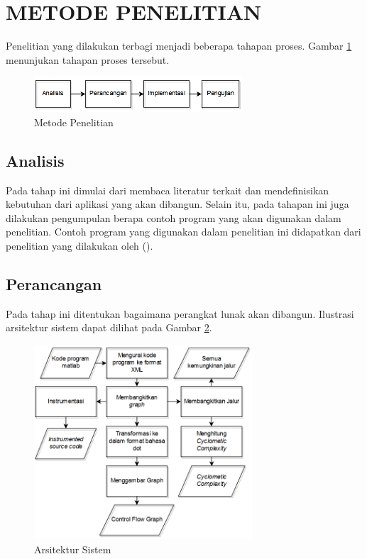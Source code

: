\section*{METODE PENELITIAN}

Penelitian yang dilakukan terbagi menjadi beberapa tahapan proses. Gambar \ref{fig:metodepenelitian} menunjukan tahapan proses tersebut.

\begin{figure}[h!]
	\centering
	\includegraphics[width=220pt]{gambar/metode_penelitian}
	\caption{Metode Penelitian}
	\label{fig:metodepenelitian}
\end{figure}

\subsection*{Analisis}

Pada tahap ini dimulai dari membaca literatur terkait dan mendefinisikan kebutuhan dari aplikasi yang akan dibangun. Selain itu, pada tahapan ini juga dilakukan pengumpulan berapa contoh program yang akan digunakan dalam penelitian. Contoh program yang digunakan dalam penelitian ini didapatkan dari penelitian yang dilakukan oleh \citeauthor{HERMADI2015} (\cite*{HERMADI2015}).  

\subsection*{Perancangan}
Pada tahap ini ditentukan bagaimana perangkat lunak akan dibangun. Ilustrasi arsitektur sistem dapat dilihat pada Gambar \ref{fig:struktur}.
\begin{figure}[h!]
	\centering
	\includegraphics[width=230pt]{gambar/struktur}
	\caption{Arsitektur Sistem}
	\label{fig:struktur}
\end{figure}

